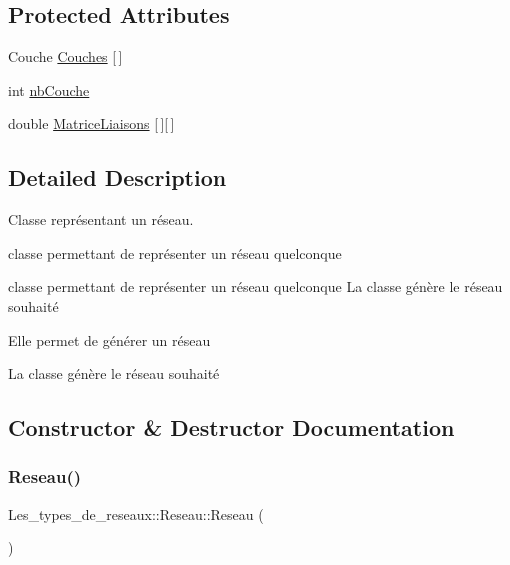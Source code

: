\subsection*{Protected Attributes}
\begin{DoxyCompactItemize}
\item 
Couche \hyperlink{class_les__types__de__reseaux_1_1_reseau_a5f2f8b87a174fbb7f8f886815adc8728}{Couches} \mbox{[}$\,$\mbox{]}
\item 
int \hyperlink{class_les__types__de__reseaux_1_1_reseau_a990bd80e6670c5bf756aab07ec1a6be4}{nb\+Couche}
\item 
double \hyperlink{class_les__types__de__reseaux_1_1_reseau_a8bbb482e67d52743d91d99912a8ad373}{Matrice\+Liaisons} \mbox{[}$\,$\mbox{]}\mbox{[}$\,$\mbox{]}
\end{DoxyCompactItemize}


\subsection{Detailed Description}
Classe représentant un réseau. 

classe permettant de représenter un réseau quelconque

classe permettant de représenter un réseau quelconque La classe génère le réseau souhaité

Elle permet de générer un réseau

La classe génère le réseau souhaité 

\subsection{Constructor \& Destructor Documentation}
\mbox{\label{class_les__types__de__reseaux_1_1_reseau_a793f474e4990cfef96ff6af55d146b96}} 
\subsubsection{\texorpdfstring{Reseau()}{Reseau()}\hspace{0.1cm}{\footnotesize\ttfamily [1/2]}}
{\footnotesize\ttfamily Les\+\_\+types\+\_\+de\+\_\+reseaux\+::\+Reseau\+::\+Reseau (\begin{DoxyParamCaption}{ }\end{DoxyParamCaption})\hspace{0.3cm}{\ttfamily [protected]}}



